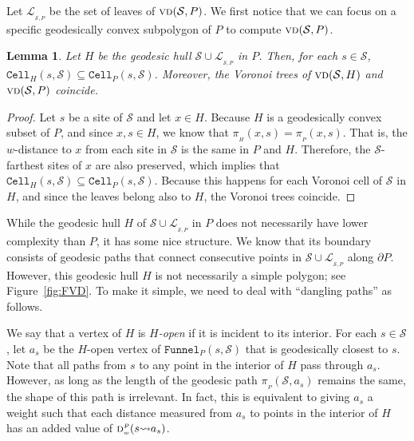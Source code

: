 \documentclass[a4paper, 11pt]{article}
\newtheorem{lemma}[theorem]{Lemma}
\newcommand{\s}{\mathcal S}
\newcommand{\dd}[3][P]{\ensuremath{\textsc{d}_{\scriptscriptstyle w}^{\scriptscriptstyle #1}(#2 {\leadsto} #3)}}
\newcommand{\p}[3][P]{\ensuremath{\pi_{_{#1}}(#2, #3)}}
\newcommand{\funnel}[2][P]{\ensuremath{\mathtt{Funnel}_{\scriptscriptstyle #1}(#2)}}
\newcommand{\cell}[2][P]{\ensuremath{\mathtt{Cell}_{\scriptscriptstyle #1}(#2)}}
\newcommand{\vd}[2][P]{\textsc{vd}(#2, #1)}
\newcommand{\LL}[1][\s, P]{\ensuremath{\mathcal L_{_{#1}}}}
\begin{document}
Let $\LL$ be the set of leaves of $\vd{\s}$.
We first notice that we can focus on a specific geodesically convex subpolygon of $P$ to compute $\vd{\s}$.

\begin{lemma}\label{lemma:Voronoi coincides for geodesically convex subsets}
Let $H$ be the geodesic hull $\s\cup \LL$ in $P$.
Then, for each $s\in \s$, $\cell[H]{s, \s} \subseteq \cell{s, \s}$. Moreover, the Voronoi trees of $\vd[H]{\s}$ and $\vd{\s}$ coincide. 
\end{lemma}
\begin{proof}
Let $s$ be a site of $\s$ and let $x\in H$. 
Because $H$ is a geodesically convex subset of $P$, and since $x,s\in H$, we know that $\p[H]{x}{s} = \p{x}{s}$. 
That is, the $w$-distance to $x$ from each site in $\s$ is the same in $P$ and $H$. 
Therefore, the $\s$-farthest sites of $x$ are also preserved, which implies that $\cell[H]{s, \s} \subseteq \cell{s, \s}$. 
Because this happens for each Voronoi cell of $\s$ in $H$, and since the leaves belong also to $H$, the Voronoi trees coincide.
\end{proof}

While the geodesic hull $H$ of $\s\cup \LL$ in $P$ does not necessarily have lower complexity than $P$, it has some nice structure. 
We know that its boundary consists of geodesic paths that connect consecutive points in $\s\cup \LL$ along $\partial P$.
However, this geodesic hull $H$ is not necessarily a simple polygon; see Figure~\ref{fig:FVD}. 
To make it simple, we need to deal with ``dangling paths'' as follows.

We say that a vertex of $H$ is \emph{$H$-open} if it is incident to its interior.
For each $s\in \s$, let $a_s$ be the $H$-open vertex of $\funnel{s, \s}$ that is geodesically closest to $s$. 
Note that all paths from $s$ to any point in the interior of $H$ pass through $a_s$.
However, as long as the length of the geodesic path $\p{\s}{a_s}$ remains the same, the shape of this path is irrelevant. 
In fact, this is equivalent to giving $a_s$ a weight such that each distance measured from $a_s$ to points in the interior of $H$ has 
an added value of $\dd{s}{a_s}$. 
\end{document}
